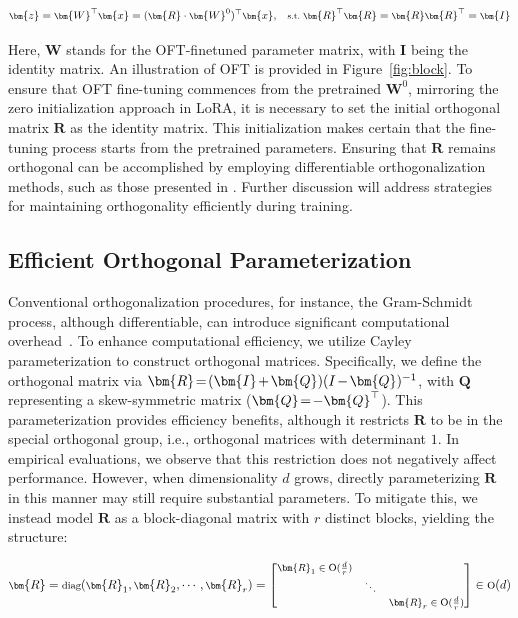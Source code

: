 \begin{equation}\label{eq:oft_general}
    \footnotesize
    \bm{z}=\bm{W}^\top\bm{x}=(\bm{R}\cdot\bm{W}^0)^\top\bm{x},~~~\text{s.t.}~\bm{R}^\top\bm{R}=\bm{R}\bm{R}^\top=\bm{I}
\end{equation}

Here, $\bm{W}$ stands for the OFT-finetuned parameter matrix, with $\bm{I}$ being the identity matrix. An illustration of OFT is provided in Figure~\ref{fig:block}. To ensure that OFT fine-tuning commences from the pretrained $\bm{W}^0$, mirroring the zero initialization approach in LoRA, it is necessary to set the initial orthogonal matrix $\bm{R}$ as the identity matrix. This initialization makes certain that the fine-tuning process starts from the pretrained parameters. Ensuring that $\bm{R}$ remains orthogonal can be accomplished by employing differentiable orthogonalization methods, such as those presented in \cite{liu2021orthogonal,lezcano2019cheap}. Further discussion will address strategies for maintaining orthogonality efficiently during training.

\subsection{Efficient Orthogonal Parameterization}\label{sect:eff_ortho}

Conventional orthogonalization procedures, for instance, the Gram-Schmidt process, although differentiable, can introduce significant computational overhead~\cite{liu2021orthogonal}. To enhance computational efficiency, we utilize Cayley parameterization to construct orthogonal matrices. Specifically, we define the orthogonal matrix via $\thickmuskip=2mu \medmuskip=2mu \bm{R}=(\bm{I}+\bm{Q})(I-\bm{Q})^{-1}$, with $\bm{Q}$ representing a skew-symmetric matrix ($\thickmuskip=2mu \medmuskip=2mu \bm{Q}=-\bm{Q}^\top$). This parameterization provides efficiency benefits, although it restricts $\bm{R}$ to be in the special orthogonal group, i.e., orthogonal matrices with determinant $1$. In empirical evaluations, we observe that this restriction does not negatively affect performance. However, when dimensionality $d$ grows, directly parameterizing $\bm{R}$ in this manner may still require substantial parameters. To mitigate this, we instead model $\bm{R}$ as a block-diagonal matrix with $r$ distinct blocks, yielding the structure:

\begin{equation}
    \footnotesize
    \bm{R}=\text{diag}(\bm{R}_1,\bm{R}_2,\cdots,\bm{R}_r)=\begin{bmatrix}
    \bm{R}_1\in \text{O}(\frac{d}{r}) &  &\\
    &\ddots & \\
    & & \bm{R}_r\in \text{O}(\frac{d}{r})
    \end{bmatrix}\in \text{O}(d)
\end{equation}

